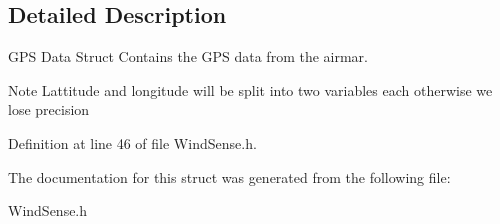\subsection{\-Detailed \-Description}
\-G\-P\-S \-Data \-Struct \-Contains the \-G\-P\-S data from the airmar. 

\-Note \-Lattitude and longitude will be split into two variables each otherwise we lose precision 

\-Definition at line 46 of file \-Wind\-Sense.\-h.



\-The documentation for this struct was generated from the following file\-:\begin{DoxyCompactItemize}
\item 
\-Wind\-Sense.\-h\end{DoxyCompactItemize}
